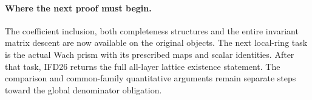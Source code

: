 \documentclass[11pt,a4paper]{article}
\numberwithin{equation}{section}
\theoremstyle{remark}\newtheorem{remark}[theorem]{Remark}
\begin{document}
\paragraph{Where the next proof must begin.}
The coefficient inclusion, both completeness structures and the
entire invariant matrix descent are now available on the original
objects. The next local-ring task is the actual Wach prism with
its prescribed maps and scalar identities. After that task, IFD26
returns the full all-layer lattice existence statement. The
comparison and common-family quantitative arguments remain separate
steps toward the global denominator obligation.

\endgroup
\end{document}
